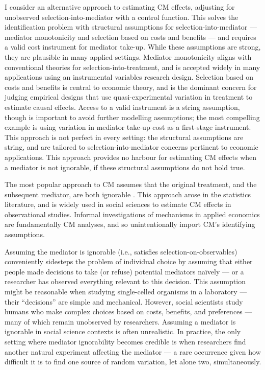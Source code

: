 I consider an alternative approach to estimating CM effects, adjusting for unobserved selection-into-mediator with a control function.
This solves the identification problem with structural assumptions for selection-into-mediator --- mediator monotonicity and selection based on costs and benefits --- and requires a valid cost instrument for mediator take-up.
While these assumptions are strong, they are plausible in many applied settings.
Mediator monotonicity aligns with conventional theories for selection-into-treatment, and is accepted widely in many applications using an instrumental variables research design.
Selection based on costs and benefits is central to economic theory, and is the dominant concern for judging empirical designs that use quasi-experimental variation in treatment to estimate causal effects.
Access to a valid instrument is a string assumption, though is important to avoid further modelling assumptions; the most compelling example is using variation in mediator take-up cost as a first-stage instrument.
This approach is not perfect in every setting: the structural assumptions are string, and are tailored to selection-into-mediator concerns pertinent to economic applications.
This approach provides no harbour for estimating CM effects when a mediator is not ignorable, if these structural assumptions do not hold true.

The most popular approach to CM assumes that the original treatment, and the subsequent mediator, are both ignorable \citep{imai2010identification}.
This approach arose in the statistics literature, and is widely used in social sciences to estimate CM effects in observational studies.
Informal investigations of mechanisms in applied economics are fundamentally CM analyses, and so unintentionally import CM's identifying assumptions.

Assuming the mediator is ignorable (i.e., satisfies selection-on-observables) 
conveniently sidesteps the problem of individual choice by assuming that either people made decisions to take (or refuse) potential mediators na\"ively --- or a researcher has observed everything relevant to this decision.
This assumption might be reasonable when studying single-celled organisms in a laboratory --- their ``decisions'' are simple and mechanical.
However, social scientists study humans who make complex choices based on costs, benefits, and preferences --- many of which remain unobserved by researchers.
Assuming a mediator is ignorable in social science contexts is often unrealistic.
In practice, the only setting where mediator ignorability becomes credible is when researchers find another natural experiment affecting the mediator --- a rare occurrence given how difficult it is to find one source of random variation, let alone two, simultaneously.

